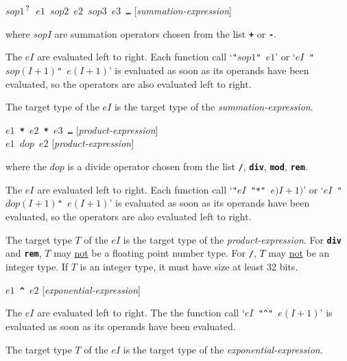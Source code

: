 \documentclass[12pt]{article}
\newcommand{\TT}[1]{{\tt \bfseries #1}}
\newcommand{\QMARK}{{$^{\,\mbox{\footnotesize ?}}$}}
\newenvironment{indpar}[1][0.3in]%
	{\begin{list}{}%
		     {\setlength{\itemsep}{0in}%
		      \setlength{\topsep}{0in}%
		      \setlength{\parsep}{1ex}%
		      \setlength{\labelwidth}{#1}%
		      \setlength{\leftmargin}{#1}%
		      \addtolength{\leftmargin}{\labelsep}}%
	 \item}%
	{\end{list}}
\begin{document}
\TT{$sop1$\QMARK{} $e1$ $sop2$ $e2$ $sop3$ $e3$ \ldots{}}
\hfill [{\em summation-expression}]
\begin{indpar}
where $sopI$ are summation operators chosen from the list
\TT{+} or \TT{-}.

The $eI$ are evaluated left to right.
Each function call
`{\tt "$sop1$" $e1$}' or
`{\tt $eI$ "$sop(I+1)$" $e(I+1)$}' is evaluated as soon as its operands have
been evaluated, so the operators are
also evaluated left to right.

The target type of the $eI$ is the target type of the
{\em summation-expression}.
\end{indpar}

\TT{$e1$ * $e2$ * $e3$ \ldots{}}
\hfill [{\em product-expression}] \\
\TT{$e1$ $dop$ $e2$}
\hfill [{\em product-expression}]
\begin{indpar}
where the $dop$ is a divide operator chosen from the list
\TT{/}, \TT{div}, \TT{mod}, \TT{rem}.

The $eI$ are evaluated left to right.
Each function call
`{\tt "$eI$ "*" $e)I+1)$}' or
`{\tt $eI$ "$dop(I+1)$" $e(I+1)$}' is evaluated as soon as its operands have
been evaluated, so the operators are
also evaluated left to right.

The target type $T$ of the $eI$ is the target type of the
{\em product-expression}.  For \TT{div} and \TT{rem}, $T$ may
\underline{not} be a floating point number type.
For \TT{/}, $T$ may \underline{not} be an integer type.
If $T$ is an integer type, it must have size at least 32 bits.

\end{indpar}

\TT{$e1$ \textasciicircum{} $e2$}
\hfill [{\em exponential-expression}]
\begin{indpar}
The $eI$ are evaluated left to right.
The the function call
`{\tt $eI$ "\textasciicircum" $e(I+1)$}' is evaluated
as soon as its operands have
been evaluated.

The target type $T$ of the $eI$ is the target type of the
{\em exponential-expression}.

\end{indpar}
\end{document}
